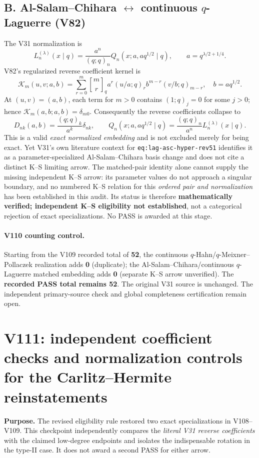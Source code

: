 \documentclass[11pt]{article}
\begin{document}
\subsection*{B. Al-Salam--Chihara $\leftrightarrow$ continuous $q$-Laguerre (V82)}
The V31 normalization is
\[
 L_n^{(\lambda)}(x\mid q)=\frac{a^n}{(q;q)_n}
 Q_n(x;a,aq^{1/2}\mid q),\qquad a=q^{\lambda/2+1/4}.
\]
V82's regularized reverse coefficient kernel is
\[
 \mathcal K_m(u,v;a,b)=\sum_{r=0}^m {m\brack r}_q
 a^r(u/a;q)_r b^{m-r}(v/b;q)_{m-r},\quad b=aq^{1/2}.
\]
At $(u,v)=(a,b)$, each term for $m>0$ contains $(1;q)_j=0$ for some $j>0$; hence $\mathcal K_m(a,b;a,b)=\delta_{m0}$. Consequently the reverse coefficients collapse to
\[
 D_{nk}(a,b)=\frac{(q;q)_k}{a^k}\delta_{nk},
 \qquad Q_n(x;a,aq^{1/2}\mid q)
 =\frac{(q;q)_n}{a^n}L_n^{(\lambda)}(x\mid q).
\]
This is a valid \emph{exact normalized embedding} and is not excluded merely for being exact. Yet V31's own literature context for \texttt{eq:lag-asc-hyper-rev51} identifies it as a parameter-specialized Al-Salam--Chihara basis change and does not cite a distinct K--S limiting arrow. The matched-pair identity alone cannot supply the missing independent K--S arrow: its parameter values do not approach a singular boundary, and no numbered K--S relation for this \emph{ordered pair and normalization} has been established in this audit. Its status is therefore \textbf{mathematically verified; independent K--S eligibility not established}, not a categorical rejection of exact specializations. No PASS is awarded at this stage.

\paragraph{V110 counting control.}
Starting from the V109 recorded total of \textbf{52}, the continuous $q$-Hahn/$q$-Meixner--Pollaczek realization adds \textbf{0} (duplicate); the Al-Salam--Chihara/continuous $q$-Laguerre matched embedding adds \textbf{0} (separate K--S arrow unverified). The \textbf{recorded PASS total remains 52}. The original V31 source is unchanged. The independent primary-source check and global completeness certification remain open.


\clearpage
\section{V111: independent coefficient checks and normalization controls for the Carlitz--Hermite reinstatements}
\noindent\textbf{Purpose.} The revised eligibility rule restored two exact specializations in V108--V109. This checkpoint independently compares the \emph{literal V31 reverse coefficients} with the claimed low-degree endpoints and isolates the indispensable rotation in the type-II case. It does not award a second PASS for either arrow.
\end{document}
